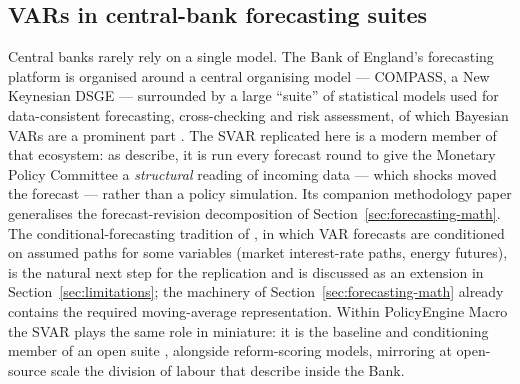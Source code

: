 \subsection{VARs in central-bank forecasting suites}

Central banks rarely rely on a single model. The Bank of England's forecasting platform is organised around a central organising model --- COMPASS, a New Keynesian DSGE --- surrounded by a large ``suite'' of statistical models used for data-consistent forecasting, cross-checking and risk assessment, of which Bayesian VARs are a prominent part \citep{burgess2013}. The SVAR replicated here is a modern member of that ecosystem: as \citet{brignone2025} describe, it is run every forecast round to give the Monetary Policy Committee a \emph{structural} reading of incoming data --- which shocks moved the forecast --- rather than a policy simulation. Its companion methodology paper \citep{brignone2026} generalises the forecast-revision decomposition of Section~\ref{sec:forecasting-math}. The conditional-forecasting tradition of \citet{waggoner1999}, in which VAR forecasts are conditioned on assumed paths for some variables (market interest-rate paths, energy futures), is the natural next step for the replication and is discussed as an extension in Section~\ref{sec:limitations}; the machinery of Section~\ref{sec:forecasting-math} already contains the required moving-average representation. Within PolicyEngine Macro the SVAR plays the same role in miniature: it is the baseline and conditioning member of an open suite \citep{policyengine}, alongside reform-scoring models, mirroring at open-source scale the division of labour that \citet{burgess2013} describe inside the Bank.

